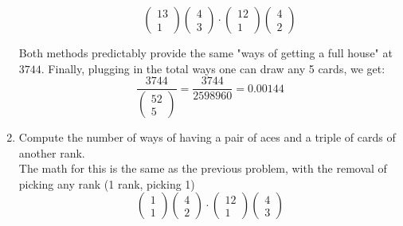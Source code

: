 \documentclass{article}
\begin{document}
\begin{enumerate}[label=\alph*)]
\begin{enumerate}[label=\arabic*.]
\begin{equation*}
\begin{pmatrix}
                13 \\
                1
            \end{pmatrix}
            \begin{pmatrix}
                4 \\
                3
            \end{pmatrix}
            \cdot
            \begin{pmatrix}
                12 \\
                1
            \end{pmatrix}
            \begin{pmatrix}
                4 \\
                2
            \end{pmatrix}
        \end{equation*}
    \end{enumerate}
    Both methods predictably provide the same "ways of getting a full house" at \(3744\).
    Finally, plugging in the total ways one can draw any 5 cards, we get:
    \begin{equation*}
        \frac{3744}{
            \begin{pmatrix}
                52 \\
                5
            \end{pmatrix}
        } = \frac{3744}{2598960} = 0.00144
    \end{equation*}
    \item Compute the number of ways of having a pair of aces and a triple of cards of another rank. \\[1\baselineskip]
    The math for this is the same as the previous problem, with the removal of picking any rank (1 rank, picking 1)
    \begin{equation*}
        \begin{pmatrix}
            1 \\
            1
        \end{pmatrix}
        \begin{pmatrix}
            4 \\
            2
        \end{pmatrix}
        \cdot
        \begin{pmatrix}
            12 \\
            1
        \end{pmatrix}
        \begin{pmatrix}
            4 \\
            3

\end{pmatrix}
\end{equation*}
\end{enumerate}
\end{document}
